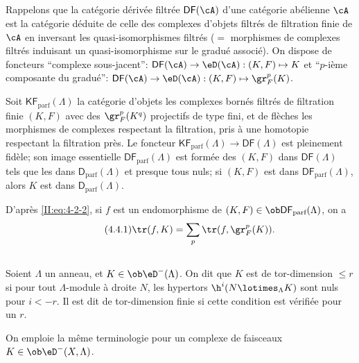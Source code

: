 \subsection{}\label{II:4-4}

Rappelons que la catégorie dérivée filtrée $\mathsf{DF}(\cA)$ d'une catégorie 
abélienne $\cA$ est la catégorie déduite de celle des complexes d'objets 
filtrés de filtration finie de $\cA$ en inversant les quasi-isomorphismes 
filtrés ($=$ morphismes de complexes filtrés induisant un quasi-isomorphisme 
sur le gradué associé). On dispose de foncteurs ``complexe sous-jacent'': 
$\mathsf{DF}(\cA)\to\eD(\cA): (K,F)\mapsto K$ et ``$p$-ième composante du 
gradué'': $\mathsf{DF}(\cA)\to\eD(\cA): (K,F)\mapsto \gr_F^p(K)$. 

Soit $\mathsf{KF}_\text{parf}(\Lambda)$ la catégorie d'objets les complexes 
bornés filtrés de filtration finie $(K,F)$ avec des $\gr_F^p(K^q)$ projectifs 
de type fini, et de flèches les morphismes de complexes respectant la 
filtration, pris à une homotopie respectant la filtration près. Le foncteur 
$\mathsf{KF}_\text{parf}(\Lambda)\to\mathsf{DF}(\Lambda)$ est pleinement fidèle; 
son image essentielle $\mathsf{DF}_\text{parf}(\Lambda)$ est formée des $(K,F)$ dans 
$\mathsf{DF}(\Lambda)$ tels que les  dans 
$\mathsf{D}_\text{parf}(\Lambda)$ et presque tous nuls; si $(K,F)$ est dans 
$\mathsf{DF}_\text{parf}(\Lambda)$, alors $K$ est dans 
$\mathsf{D}_\text{parf}(\Lambda)$. 

D'après \eqref{II:eq:4-2-2}, si $f$ est un endomorphisme de 
$(K,F)\in\ob\mathsf{DF}_\text{parf}(\Lambda)$, on a 
\begin{equation*}\tag{4.4.1}\label{II:eq:4-4-1}
 \tr(f,K) = \sum_p \tr(f,\gr_F^p(K)) \text{.}
\end{equation*}





\subsection{}\label{II:4-5}

Soient $\Lambda$ un anneau, et $K\in\ob\eD^-(\Lambda)$. On dit que $K$ est de 
tor-dimension $\leqslant r$ si pour tout $\Lambda$-module à droite $N$, les 
hypertors $\h^i(N\lotimes_\Lambda K)$ sont nuls pour $i<-r$. Il est dit de 
tor-dimension finie si cette condition est vérifiée pour un $r$. 

On emploie la même terminologie pour un complexe de faisceaux 
$K\in\ob\eD^-(X,\Lambda)$. 





